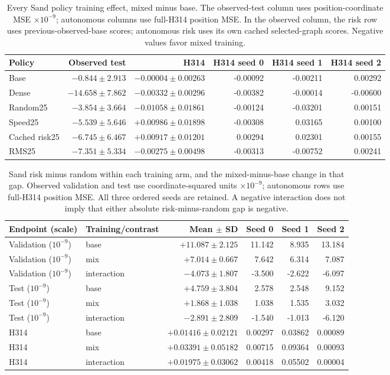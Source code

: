 \begin{table}[t]
\centering\scriptsize
\caption{Every Sand policy training effect, mixed minus base. The observed-test column uses position-coordinate MSE $\times10^{-9}$; autonomous columns use full-H314 position MSE. In the observed column, the risk row uses previous-observed-base scores; autonomous risk uses its own cached selected-graph scores. Negative values favor mixed training.}
\label{tab:sand-all-training-effects}
\setlength{\tabcolsep}{3pt}
\begin{tabular}{lrrrrr}
\toprule
Policy & Observed test & H314 & H314 seed 0 & H314 seed 1 & H314 seed 2\\
\midrule
Base & $-0.844\pm2.913$ & $-0.00004\pm0.00263$ & -0.00092 & -0.00211 & 0.00292\\
Dense & $-14.658\pm7.862$ & $-0.00332\pm0.00296$ & -0.00382 & -0.00014 & -0.00600\\
Random25 & $-3.854\pm3.664$ & $-0.01058\pm0.01861$ & -0.00124 & -0.03201 & 0.00151\\
Speed25 & $-5.539\pm5.646$ & $+0.00986\pm0.01898$ & -0.00308 & 0.03165 & 0.00100\\
Cached risk25 & $-6.745\pm6.467$ & $+0.00917\pm0.01201$ & 0.00294 & 0.02301 & 0.00155\\
RMS25 & $-7.351\pm5.334$ & $-0.00275\pm0.00498$ & -0.00313 & -0.00752 & 0.00241\\
\bottomrule
\end{tabular}
\end{table}
\begin{table}[t]
\centering\scriptsize
\caption{Sand risk minus random within each training arm, and the mixed-minus-base change in that gap. Observed validation and test use coordinate-squared units $\times10^{-9}$; autonomous rows use full-H314 position MSE. All three ordered seeds are retained. A negative interaction does not imply that either absolute risk-minus-random gap is negative.}
\label{tab:sand-all-placement}
\setlength{\tabcolsep}{3pt}
\begin{tabular}{llrrrr}
\toprule
Endpoint (scale) & Training/contrast & Mean $\pm$ SD & Seed 0 & Seed 1 & Seed 2\\
\midrule
Validation ($10^{-9}$) & base & $+11.087\pm2.125$ & 11.142 & 8.935 & 13.184\\
Validation ($10^{-9}$) & mix & $+7.014\pm0.667$ & 7.642 & 6.314 & 7.087\\
Validation ($10^{-9}$) & interaction & $-4.073\pm1.807$ & -3.500 & -2.622 & -6.097\\
Test ($10^{-9}$) & base & $+4.759\pm3.804$ & 2.578 & 2.548 & 9.152\\
Test ($10^{-9}$) & mix & $+1.868\pm1.038$ & 1.038 & 1.535 & 3.032\\
Test ($10^{-9}$) & interaction & $-2.891\pm2.809$ & -1.540 & -1.013 & -6.120\\
H314 & base & $+0.01416\pm0.02121$ & 0.00297 & 0.03862 & 0.00089\\
H314 & mix & $+0.03391\pm0.05182$ & 0.00715 & 0.09364 & 0.00093\\
H314 & interaction & $+0.01975\pm0.03062$ & 0.00418 & 0.05502 & 0.00004\\
\bottomrule
\end{tabular}
\end{table}
